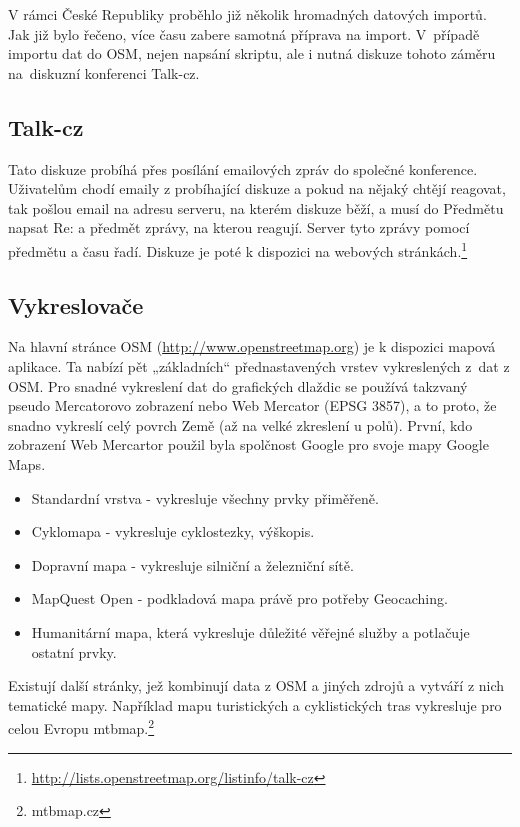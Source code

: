 V rámci České Republiky proběhlo již několik hromadných datových importů. Jak 
již bylo řečeno, více času zabere samotná příprava na import.
V~případě importu dat do OSM, nejen napsání skriptu, ale i nutná diskuze tohoto záměru
na~diskuzní konferenci Talk-cz. 

\subsection{Talk-cz}
\label{Talk-cz}
Tato diskuze probíhá přes posílání emailových zpráv do společné konference. 
Uživatelům chodí emaily z probíhající diskuze a pokud na nějaký chtějí reagovat,
tak pošlou email na adresu serveru, na kterém diskuze běží, a musí do Předmětu 
napsat Re: a předmět zprávy, na kterou reagují. Server tyto zprávy pomocí 
předmětu a času řadí. Diskuze je poté k dispozici na webových stránkách.\footnote{\url{http://lists.openstreetmap.org/listinfo/talk-cz}}

\subsection{Vykreslovače}
\label{Vykreslovače}
Na hlavní stránce OSM (\url{http://www.openstreetmap.org}) je k dispozici mapová aplikace. Ta nabízí pět
„základních“ přednastavených vrstev vykreslených z~dat z OSM.
Pro snadné vykreslení dat do grafických dlaždic se používá takzvaný pseudo Mercatorovo
zobrazení nebo Web Mercator (EPSG 3857), a to proto, že snadno vykreslí celý povrch Země (až na velké zkreslení u polů). 
První, kdo zobrazení Web Mercartor použil byla spolčnost Google pro svoje mapy Google Maps.\cite{WebMercator}

\begin{itemize}
  \item Standardní vrstva - vykresluje všechny prvky přiměřeně.
  \item Cyklomapa - vykresluje cyklostezky, výškopis. 
  \item Dopravní mapa - vykresluje silniční a železniční sítě.
  \item MapQuest Open - podkladová mapa právě pro potřeby Geocaching.
  \item Humanitární mapa, která vykresluje důležité věřejné služby a potlačuje ostatní prvky. 
\end{itemize}

Existují další stránky, jež kombinují data z OSM a jiných zdrojů a vytváří z nich tematické mapy.
Například mapu turistických a cyklistických tras vykresluje
pro celou Evropu mtbmap.\footnote{mtbmap.cz}

